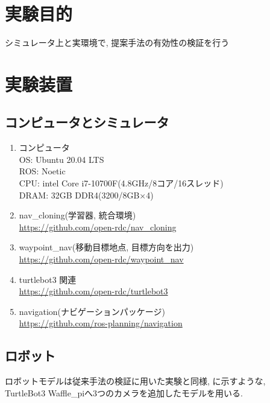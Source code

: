 

  \section{実験目的}
  シミュレータ上と実環境で, 提案手法の有効性の検証を行う
  \section{実験装置}
 \subsection{コンピュータとシミュレータ}
    \begin{enumerate}
      \item コンピュータ\\
      OS: Ubuntu 20.04 LTS\\
      ROS: Noetic\\
      CPU: intel Core i7-10700F(4.8GHz/8コア/16スレッド)\\
      DRAM: 32GB DDR4(3200/8GB×4)
      \item nav\_cloning(学習器, 統合環境)\\
      \url{https://github.com/open-rdc/nav_cloning}
      \item waypoint\_nav(移動目標地点, 目標方向を出力)\\
      \url{https://github.com/open-rdc/waypoint_nav}
      \item turtlebot3 関連\\
      \url{https://github.com/open-rdc/turtlebot3}
      \newpage
      \item navigation(ナビゲーションパッケージ)\\
      \url{https://github.com/ros-planning/navigation}
    \end{enumerate}

    \subsection{ロボット}
    ロボットモデルは従来手法の検証に用いた実験\cite{okada1}\cite{okada2}と同様, に示すような, TurtleBot3 Waffle\_pi\cite{turtlebot3}へ3つのカメラを追加したモデルを用いる.

